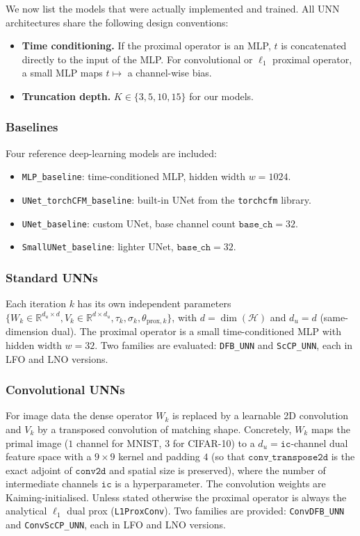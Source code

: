 \documentclass[a4paper,11pt]{article}
\theoremstyle{plain}{\theorembodyfont{\rmfamily}%
\newtheorem{proposition}[theorem]{Proposition}}
\theoremstyle{plain}{\theorembodyfont{\rmfamily}%
\newtheorem{notation}[theorem]{Notation}}
\theoremstyle{plain}{\theorembodyfont{\rmfamily}%
\newtheorem{assumption}[theorem]{Assumption}}
\theoremstyle{plain}{\theorembodyfont{\rmfamily}%
\newtheorem{problem}[theorem]{Problem}}
\theoremstyle{plain}{\theorembodyfont{\rmfamily}%
\newtheorem{example}[theorem]{Example}}
\theoremstyle{plain}{\theorembodyfont{\rmfamily}%
\newtheorem{remark}[theorem]{Remark}}
\theoremstyle{plain}{\theorembodyfont{\rmfamily}%
\newtheorem{definition}[theorem]{Definition}}
\theoremstyle{plain}{\theorembodyfont{\rmfamily}%
\newtheorem{question}[theorem]{Question}}
\numberwithin{equation}{section}
\begin{document}
We now list the models that were actually implemented and trained. All UNN
architectures share the following design conventions:
\begin{itemize}
    \item \textbf{Time conditioning.} If the proximal operator is an MLP, $t$ is
          concatenated directly to the input of the MLP. For convolutional or $\ell_1$ proximal operator, a small MLP maps $t \mapsto$ a channel-wise bias.
    \item \textbf{Truncation depth.} $K \in \{3, 5, 10, 15\}$ for our models.
\end{itemize}

\subsubsection{Baselines}

Four reference deep-learning models are included:
\begin{itemize}
    \item \texttt{MLP\_baseline}: time-conditioned MLP, hidden width $w = 1024$.
    \item \texttt{UNet\_torchCFM\_baseline}: built-in UNet from the \texttt{torchcfm} library.
    \item \texttt{UNet\_baseline}: custom UNet, base channel count $\texttt{base\_ch} = 32$.
    \item \texttt{SmallUNet\_baseline}: lighter UNet, $\texttt{base\_ch} = 32$.
\end{itemize}

\subsubsection{Standard UNNs}

Each iteration $k$ has its own independent parameters
$\{W_k \in \mathbb{R}^{d_u \times d}, V_k \in \mathbb{R}^{d \times d_u}, \tau_k, \sigma_k,
\theta_{\text{prox},k}\}$, with $d = \dim(\mathcal{H})$ and $d_u = d$ (same-dimension dual).
The proximal operator is a small time-conditioned MLP with hidden width $w = 32$.
Two families are evaluated: \texttt{DFB\_UNN} and
\texttt{ScCP\_UNN}, each in LFO and LNO versions.

\subsubsection{Convolutional UNNs}
\label{subsubsec:convolutional}

For image data the dense operator $W_k$ is replaced by a learnable 2D
convolution and $V_k$ by a transposed convolution of matching shape. Concretely,
$W_k$ maps the primal image ($1$ channel for MNIST, $3$ for CIFAR-10) to a
$d_u = \texttt{ic}$-channel dual feature space with a $9\times 9$ kernel and padding $4$ (so that
$\texttt{conv\_transpose2d}$ is the exact adjoint of $\texttt{conv2d}$ and spatial
size is preserved), where the number of intermediate channels $\texttt{ic}$ is a
hyperparameter. The convolution weights are Kaiming-initialised. Unless stated
otherwise the proximal operator is always the analytical $\ell_1$ dual prox
(\texttt{L1ProxConv}). Two
families are provided: \texttt{ConvDFB\_UNN} and
\texttt{ConvScCP\_UNN}, each in LFO and LNO versions. 
\end{document}

